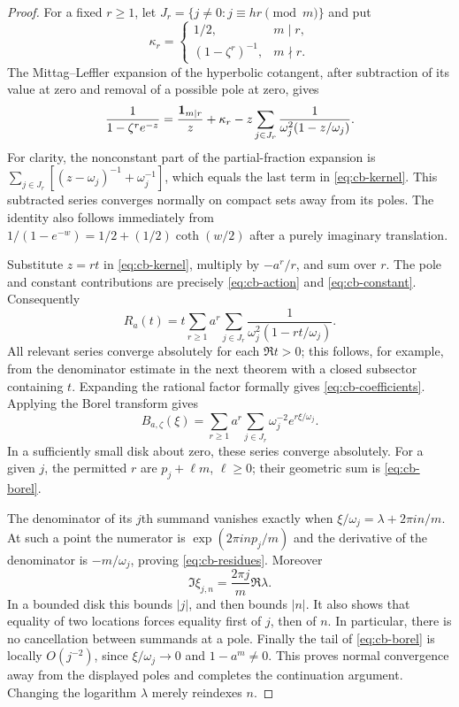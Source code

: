 \begin{proof}
For a fixed $r\geq1$, let
$J_r=\{j\ne0:j\equiv hr\pmod m\}$ and put
\[
 \kappa_r=\begin{cases}
  1/2,&m\mid r,\\
  (1-\zeta^r)^{-1},&m\nmid r.
 \end{cases}
\]
The Mittag--Leffler expansion of the hyperbolic cotangent, after
subtraction of its value at zero and removal of a possible pole at zero,
gives
\begin{equation}
 \frac{1}{1-\zeta^r e^{-z}}
 =\frac{{\bf1}_{m\mid r}}{z}+\kappa_r
  -z\sum_{j\in J_r}
       \frac{1}{\omega_j^2(1-z/\omega_j)}.
 \label{eq:cb-kernel}
\end{equation}
For clarity, the nonconstant part of the partial-fraction expansion is
$\sum_{j\in J_r}[(z-\omega_j)^{-1}+\omega_j^{-1}]$,
which equals the last term in \eqref{eq:cb-kernel}.  This subtracted series
converges normally on compact sets away from its poles.  The identity
also follows immediately from
$1/(1-e^{-w})=1/2+(1/2)\coth(w/2)$ after a purely imaginary translation.

Substitute $z=rt$ in \eqref{eq:cb-kernel}, multiply by $-a^r/r$, and
sum over $r$.  The pole and constant contributions are precisely
\eqref{eq:cb-action} and \eqref{eq:cb-constant}.  Consequently
\begin{equation}
 R_a(t)=t\sum_{r\geq1}a^r
             \sum_{j\in J_r}
               \frac{1}{\omega_j^2(1-rt/\omega_j)}.
 \label{eq:cb-exact-kernel}
\end{equation}
All relevant series converge absolutely for each $\Re t>0$; this follows,
for example, from the denominator estimate in the next theorem with a
closed subsector containing $t$.  Expanding the rational factor formally
gives \eqref{eq:cb-coefficients}.  Applying the Borel transform gives
\[
 B_{a,\zeta}(\xi)
 =\sum_{r\geq1}a^r\sum_{j\in J_r}
          \omega_j^{-2}e^{r\xi/\omega_j}.
\]
In a sufficiently small disk about zero, these series converge
absolutely.  For a given $j$, the permitted $r$ are $p_j+\ell m$,
$\ell\geq0$; their geometric sum is \eqref{eq:cb-borel}.

The denominator of its $j$th summand vanishes exactly when
$\xi/\omega_j=\lambda+2\pi i n/m$.  At such a point the numerator is
$\exp(2\pi i n p_j/m)$ and the derivative of the denominator is
$-m/\omega_j$, proving \eqref{eq:cb-residues}.  Moreover
\[
 \Im\xi_{j,n}=\frac{2\pi j}{m}\Re\lambda.
\]
In a bounded disk this bounds $|j|$, and then bounds $|n|$.  It also shows
that equality of two locations forces equality first of $j$, then of
$n$.  In particular, there is no cancellation between summands at a pole.
Finally the tail of \eqref{eq:cb-borel} is locally $O(j^{-2})$, since
$\xi/\omega_j\to0$ and $1-a^m\ne0$.  This proves normal convergence away
from the displayed poles and completes the continuation argument.
Changing the logarithm $\lambda$ merely reindexes $n$.
\end{proof}


